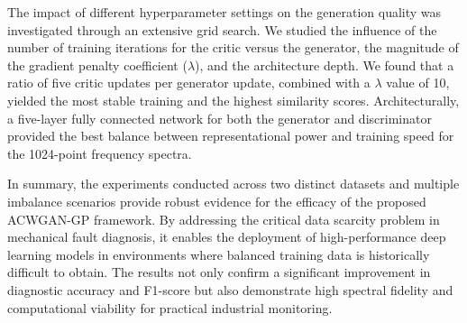 The impact of different hyperparameter settings on the generation quality was investigated through an extensive grid search. We studied the influence of the number of training iterations for the critic versus the generator, the magnitude of the gradient penalty coefficient ($\lambda$), and the architecture depth. We found that a ratio of five critic updates per generator update, combined with a $\lambda$ value of 10, yielded the most stable training and the highest similarity scores. Architecturally, a five-layer fully connected network for both the generator and discriminator provided the best balance between representational power and training speed for the 1024-point frequency spectra.

In summary, the experiments conducted across two distinct datasets and multiple imbalance scenarios provide robust evidence for the efficacy of the proposed ACWGAN-GP framework. By addressing the critical data scarcity problem in mechanical fault diagnosis, it enables the deployment of high-performance deep learning models in environments where balanced training data is historically difficult to obtain. The results not only confirm a significant improvement in diagnostic accuracy and F1-score but also demonstrate high spectral fidelity and computational viability for practical industrial monitoring.
